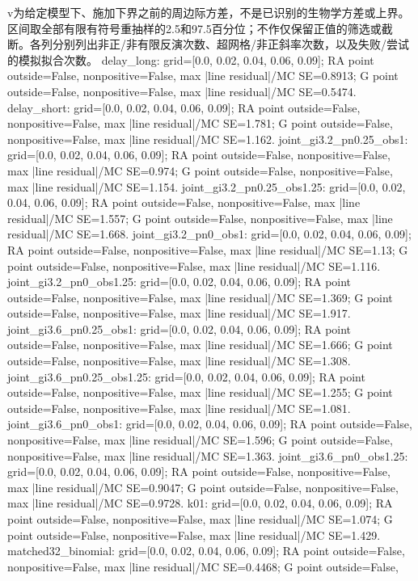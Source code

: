 \begin{table}[htbp]
\begin{tabularx}{\linewidth}
\bottomrule
\end{tabularx}
\par\smallskip
\begin{minipage}{\linewidth}\footnotesize\raggedright
v为给定模型下、施加下界之前的周边际方差，不是已识别的生物学方差或上界。区间取全部有限有符号重抽样的2.5和97.5百分位；不作仅保留正值的筛选或截断。各列分别列出非正/非有限反演次数、超网格/非正斜率次数，以及失败/尝试的模拟拟合次数。 delay\_\allowbreak{}long: grid=[0.0, 0.02, 0.04, 0.06, 0.09]; RA point outside=False, nonpositive=False, max |line residual|/MC SE=0.8913; G point outside=False, nonpositive=False, max |line residual|/MC SE=0.5474. delay\_\allowbreak{}short: grid=[0.0, 0.02, 0.04, 0.06, 0.09]; RA point outside=False, nonpositive=False, max |line residual|/MC SE=1.781; G point outside=False, nonpositive=False, max |line residual|/MC SE=1.162. joint\_\allowbreak{}gi3.2\_\allowbreak{}pn0.25\_\allowbreak{}obs1: grid=[0.0, 0.02, 0.04, 0.06, 0.09]; RA point outside=False, nonpositive=False, max |line residual|/MC SE=0.974; G point outside=False, nonpositive=False, max |line residual|/MC SE=1.154. joint\_\allowbreak{}gi3.2\_\allowbreak{}pn0.25\_\allowbreak{}obs1.25: grid=[0.0, 0.02, 0.04, 0.06, 0.09]; RA point outside=False, nonpositive=False, max |line residual|/MC SE=1.557; G point outside=False, nonpositive=False, max |line residual|/MC SE=1.668. joint\_\allowbreak{}gi3.2\_\allowbreak{}pn0\_\allowbreak{}obs1: grid=[0.0, 0.02, 0.04, 0.06, 0.09]; RA point outside=False, nonpositive=False, max |line residual|/MC SE=1.13; G point outside=False, nonpositive=False, max |line residual|/MC SE=1.116. joint\_\allowbreak{}gi3.2\_\allowbreak{}pn0\_\allowbreak{}obs1.25: grid=[0.0, 0.02, 0.04, 0.06, 0.09]; RA point outside=False, nonpositive=False, max |line residual|/MC SE=1.369; G point outside=False, nonpositive=False, max |line residual|/MC SE=1.917. joint\_\allowbreak{}gi3.6\_\allowbreak{}pn0.25\_\allowbreak{}obs1: grid=[0.0, 0.02, 0.04, 0.06, 0.09]; RA point outside=False, nonpositive=False, max |line residual|/MC SE=1.666; G point outside=False, nonpositive=False, max |line residual|/MC SE=1.308. joint\_\allowbreak{}gi3.6\_\allowbreak{}pn0.25\_\allowbreak{}obs1.25: grid=[0.0, 0.02, 0.04, 0.06, 0.09]; RA point outside=False, nonpositive=False, max |line residual|/MC SE=1.255; G point outside=False, nonpositive=False, max |line residual|/MC SE=1.081. joint\_\allowbreak{}gi3.6\_\allowbreak{}pn0\_\allowbreak{}obs1: grid=[0.0, 0.02, 0.04, 0.06, 0.09]; RA point outside=False, nonpositive=False, max |line residual|/MC SE=1.596; G point outside=False, nonpositive=False, max |line residual|/MC SE=1.363. joint\_\allowbreak{}gi3.6\_\allowbreak{}pn0\_\allowbreak{}obs1.25: grid=[0.0, 0.02, 0.04, 0.06, 0.09]; RA point outside=False, nonpositive=False, max |line residual|/MC SE=0.9047; G point outside=False, nonpositive=False, max |line residual|/MC SE=0.9728. k01: grid=[0.0, 0.02, 0.04, 0.06, 0.09]; RA point outside=False, nonpositive=False, max |line residual|/MC SE=1.074; G point outside=False, nonpositive=False, max |line residual|/MC SE=1.429. matched32\_\allowbreak{}binomial: grid=[0.0, 0.02, 0.04, 0.06, 0.09]; RA point outside=False, nonpositive=False, max |line residual|/MC SE=0.4468; G point outside=False, 
\end{minipage}
\end{table}
